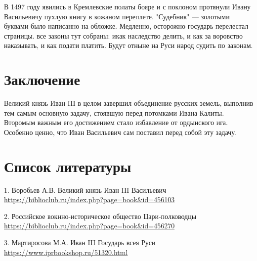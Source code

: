 	В 1497 году явились в Кремлевские полаты бояре и с поклоном протянули Ивану Васильевичу пухлую книгу в кожаном переплете. "Судебник" --- золотыми буквами было написанно на обложке. Медленно, осторожно государь перелестал страницы. все законы тут собраны: икак наследство делить, и как за воровство наказывать, и как подати платить. Будут отныне на Руси народ судить по законам.



\section{Заключение}
	Великий князь Иван III в целом завершил объединение русских земель, выполнив тем самым основную задачу, стоявшую перед потомками Ивана Калиты. Второмым важным его достижением стало избавление от ордынского ига. Особенно ценно, что Иван Васильевич сам поставил перед собой эту задачу.

\newpage
\section{Список литературы}
	1. Воробьев А.В. Великий князь Иван III Васильевич \url{https://biblioclub.ru/index.php?page=book&id=456103}


	2. Российское вокнно-историческое общество Цари-полководцы \url{https://biblioclub.ru/index.php?page=book&id=456270}

	3. Мартиросова М.А. Иван III Государь всея Руси \url{https://www.iprbookshop.ru/51320.html}


